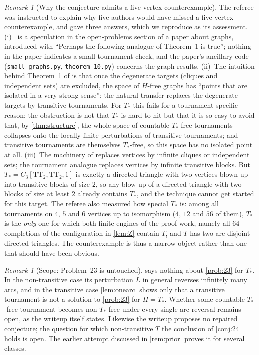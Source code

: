 \documentclass[11pt,a4paper]{article}
\theoremstyle{plain}
\theoremstyle{definition}
\theoremstyle{remark}
\newtheorem{remark}[theorem]{Remark}
\newcommand{\Tstar}{T_{\ast}}
\newcommand{\TT}{\mathrm{TT}}
\begin{document}
\begin{remark}[Why the conjecture admits a five-vertex counterexample]\label{rem:why}
The referee was instructed to explain why five authors would have missed a five-vertex counterexample, and gave three answers, which we reproduce as its assessment. (i)~ is a speculation in the open-problems section of a paper about graphs, introduced with ``Perhaps the following analogue of Theorem~1 is true''; nothing in the paper indicates a small-tournament check, and the paper's ancillary code (\texttt{small\_graphs.py}, \texttt{theorem\_10.py}) concerns the graph results. (ii)~The intuition behind Theorem~1 of \cite{BGJMS25} is that once the degenerate targets (cliques and independent sets) are excluded, the space of $H$-free graphs has ``points that are isolated in a very strong sense''; the natural transfer replaces the degenerate targets by transitive tournaments. For $\Tstar$ this fails for a tournament-specific reason: the obstruction is not that $\Tstar$ is hard to hit but that it is so easy to avoid that, by \cref{thm:structure}, the whole space of countable $\Tstar$-free tournaments collapses onto the locally finite perturbations of transitive tournaments; and transitive tournaments are themselves $\Tstar$-free, so this space has no isolated point at all. (iii)~The machinery of \cite{BGJMS25} replaces vertices by infinite cliques or independent sets; the tournament analogue replaces vertices by infinite transitive blocks. But $\Tstar=C_3[\TT_2,\TT_2,1]$ is exactly a directed triangle with two vertices blown up into transitive blocks of size $2$, so any blow-up of a directed triangle with two blocks of size at least $2$ already contains $\Tstar$, and the technique cannot get started for this target. The referee also measured how special $\Tstar$ is: among all tournaments on $4$, $5$ and $6$ vertices up to isomorphism ($4$, $12$ and $56$ of them), $\Tstar$ is the \emph{only} one for which both finite engines of the proof work, namely all $64$ completions of the configuration in \cref{lem:Z} contain $T$, and $T$ has two arc-disjoint directed triangles. The counterexample is thus a narrow object rather than one that should have been obvious.
\end{remark}

\begin{remark}[Scope: Problem~23 is untouched]\label{rem:p23}
 says nothing about \cref{prob:23} for $\Tstar$. In the non-transitive case its perturbation $L$ in general reverses infinitely many arcs, and in the transitive case \cref{lem:onearc} shows only that a transitive tournament is not a solution to \cref{prob:23} for $H=\Tstar$. Whether some countable $\Tstar$-free tournament becomes non-$\Tstar$-free under every single arc reversal remains open, as the writeup itself states. Likewise the writeup proposes no repaired conjecture; the question for which non-transitive $T$ the conclusion of \cref{conj:24} holds is open. The earlier attempt discussed in \cref{rem:prior} proves it for several classes.
\end{remark}
\end{document}
